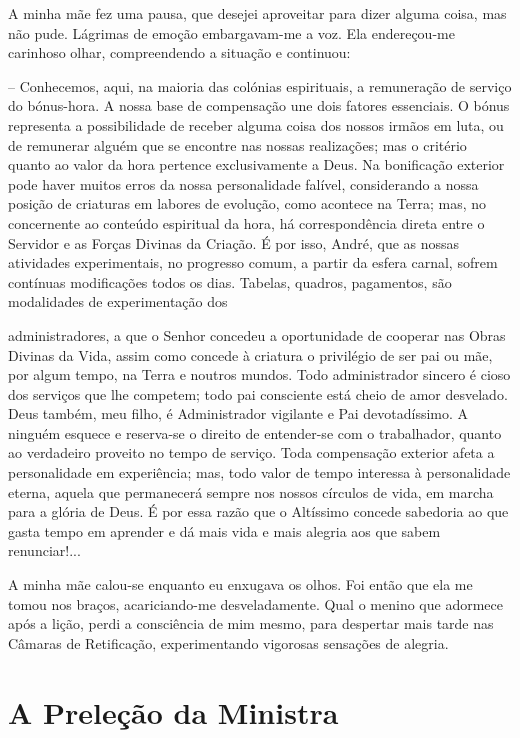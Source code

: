 \documentclass[portuguese,12pt,a4paper]{scrbook}
\begin{document}
	A minha mãe fez uma pausa, que desejei aproveitar para dizer alguma coisa, mas não pude. Lágrimas de emoção embargavam-me a voz. Ela endereçou-me carinhoso olhar, compreendendo a situação e continuou:
	
	– Conhecemos, aqui, na maioria das colónias espirituais, a remuneração de serviço do bónus-hora. A nossa base de compensação une dois fatores essenciais. O bónus representa a possibilidade de receber alguma coisa dos nossos irmãos em luta, ou de remunerar alguém que se encontre nas nossas realizações; mas o critério quanto ao valor da hora pertence exclusivamente a Deus. Na bonificação exterior pode haver muitos erros da nossa personalidade falível, considerando a nossa posição de criaturas em labores de evolução, como acontece na Terra; mas, no concernente ao conteúdo espiritual da hora, há correspondência direta entre o Servidor e as Forças Divinas da Criação. É por isso, André, que as nossas atividades experimentais, no progresso comum, a partir da esfera carnal, sofrem contínuas modificações todos os dias. Tabelas, quadros, pagamentos, são modalidades de experimentação dos
	
	
	administradores, a que o Senhor concedeu a oportunidade de cooperar nas Obras Divinas da Vida, assim como concede à criatura o privilégio de ser pai ou mãe, por algum tempo, na Terra e noutros mundos. Todo administrador sincero é cioso dos serviços que lhe competem; todo pai consciente está cheio de amor desvelado. Deus também, meu filho, é Administrador vigilante e Pai devotadíssimo. A ninguém esquece e reserva-se o direito de entender-se com o trabalhador, quanto ao verdadeiro proveito no tempo de serviço. Toda compensação exterior afeta a personalidade em experiência; mas, todo valor de tempo interessa à personalidade eterna, aquela que permanecerá sempre nos nossos círculos de vida, em marcha para a glória de Deus. É por essa razão que o Altíssimo concede sabedoria ao que gasta tempo em aprender e dá mais vida e mais alegria aos que sabem renunciar!...
	
	A minha mãe calou-se enquanto eu enxugava os olhos. Foi então que ela me tomou nos braços, acariciando-me desveladamente. Qual o menino que adormece após a lição, perdi a consciência de mim mesmo, para despertar mais tarde nas Câmaras de Retificação, experimentando vigorosas sensações de alegria.
	
	
	\chapter{A Preleção da Ministra}
	
\end{document}
